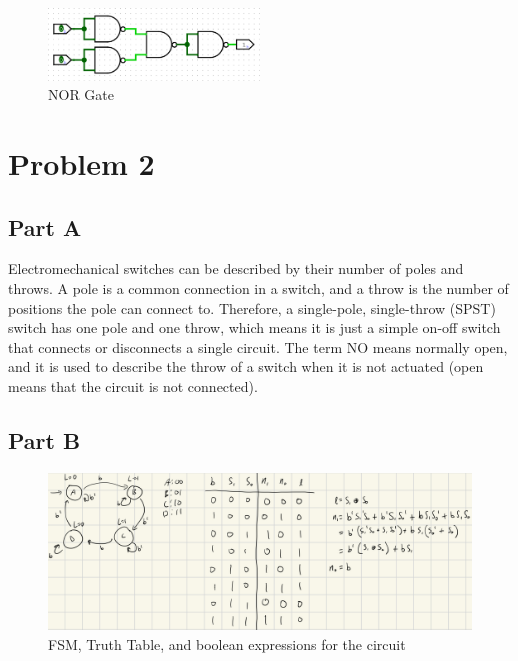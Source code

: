\documentclass{article}
\begin{document}
\begin{figure}[H]
    \centering
    \includegraphics[width=0.5\textwidth]{./images/nor_with_nand.png}
    \caption{NOR Gate}
\end{figure}

\newpage
\section*{Problem 2}

\subsection*{Part A}
Electromechanical switches can be described by their number of poles and throws.
A pole is a common connection in a switch, and a throw is the number of positions the pole can connect to.
Therefore, a single-pole, single-throw (SPST) switch has one pole and one throw, which means it is just a simple on-off switch that connects or disconnects a single circuit.
The term NO means normally open, and it is used to describe the throw of a switch when it is not actuated (open means that the circuit is not connected).

\subsection*{Part B}
\begin{figure}[H]
    \centering
    \includegraphics[width=\textwidth]{./images/problem2_plan.jpeg}
    \caption{FSM, Truth Table, and boolean expressions for the circuit}
\end{figure}
\end{document}
